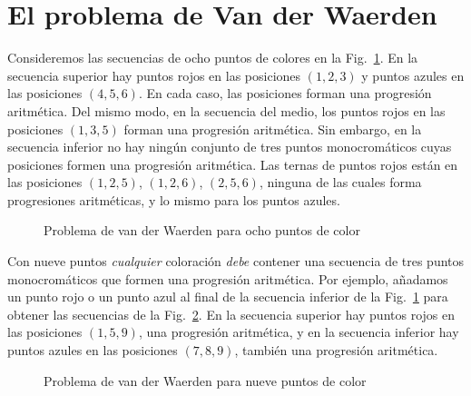 
\section{El problema de Van der Waerden}\label{s.van}

Consideremos las secuencias de ocho puntos de colores en la Fig.~\ref{f.vdw1}. En la secuencia superior hay puntos rojos en las posiciones $(1,2,3)$ y puntos azules en las posiciones $(4,5,6)$. En cada caso, las posiciones forman una progresión aritmética. Del mismo modo, en la secuencia del medio, los puntos rojos en las posiciones $(1,3,5)$ forman una progresión aritmética. Sin embargo, en la secuencia inferior no hay ningún conjunto de tres puntos monocromáticos cuyas posiciones formen una progresión aritmética. 
Las ternas de puntos rojos están en las posiciones $(1,2,5)$, $(1,2,6)$, $(2,5,6)$, ninguna de las cuales forma progresiones aritméticas, y lo mismo para los puntos azules.

\begin{figure}[htb]
\begin{center}
\end{center}
\caption{Problema de van der Waerden para ocho puntos de color}\label{f.vdw1}
\end{figure}

Con nueve puntos \emph{cualquier} coloración \emph{debe} contener una secuencia de tres puntos monocromáticos que formen una progresión aritmética. Por ejemplo, añadamos un punto rojo o un punto azul al final de la secuencia inferior de la Fig.~\ref{f.vdw1} para obtener las secuencias de la Fig.~\ref{f.vdw2}. En la secuencia superior hay puntos rojos en las posiciones $(1,5,9)$, una progresión aritmética, y en la secuencia inferior hay puntos azules en las posiciones $(7,8,9)$, también una progresión aritmética.
\begin{figure}[htb]
\begin{center}
\end{center}
\caption{Problema de van der Waerden para nueve puntos de color}\label{f.vdw2}
\end{figure}

